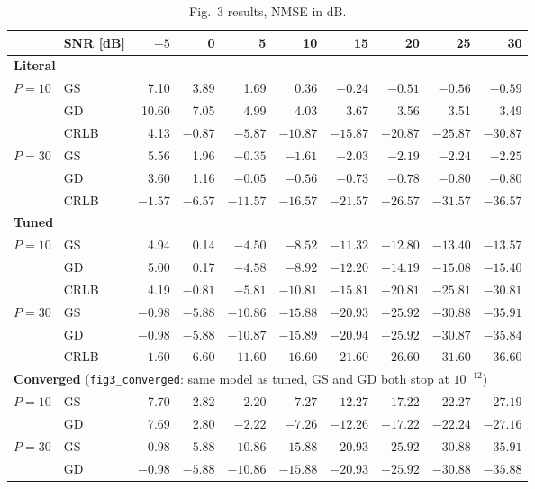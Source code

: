 \documentclass[11pt,a4paper]{article}
\newcommand{\file}[1]{\texttt{#1}}
\begin{document}
\begin{table}[h!]
\centering
\footnotesize
\caption{Fig.~3 results, NMSE in dB.}
\label{tab:fig3res}
\begin{tabular}{llrrrrrrrr}
\toprule
& SNR [dB] & $-5$ & 0 & 5 & 10 & 15 & 20 & 25 & 30 \\
\midrule
\multicolumn{10}{l}{\textbf{Literal}} \\
$P=10$ & GS   & 7.10 & 3.89 & 1.69 & 0.36 & $-0.24$ & $-0.51$ & $-0.56$ & $-0.59$ \\
       & GD   & 10.60 & 7.05 & 4.99 & 4.03 & 3.67 & 3.56 & 3.51 & 3.49 \\
       & CRLB & 4.13 & $-0.87$ & $-5.87$ & $-10.87$ & $-15.87$ & $-20.87$ & $-25.87$ & $-30.87$ \\
$P=30$ & GS   & 5.56 & 1.96 & $-0.35$ & $-1.61$ & $-2.03$ & $-2.19$ & $-2.24$ & $-2.25$ \\
       & GD   & 3.60 & 1.16 & $-0.05$ & $-0.56$ & $-0.73$ & $-0.78$ & $-0.80$ & $-0.80$ \\
       & CRLB & $-1.57$ & $-6.57$ & $-11.57$ & $-16.57$ & $-21.57$ & $-26.57$ & $-31.57$ & $-36.57$ \\
\midrule
\multicolumn{10}{l}{\textbf{Tuned}} \\
$P=10$ & GS   & 4.94 & 0.14 & $-4.50$ & $-8.52$ & $-11.32$ & $-12.80$ & $-13.40$ & $-13.57$ \\
       & GD   & 5.00 & 0.17 & $-4.58$ & $-8.92$ & $-12.20$ & $-14.19$ & $-15.08$ & $-15.40$ \\
       & CRLB & 4.19 & $-0.81$ & $-5.81$ & $-10.81$ & $-15.81$ & $-20.81$ & $-25.81$ & $-30.81$ \\
$P=30$ & GS   & $-0.98$ & $-5.88$ & $-10.86$ & $-15.88$ & $-20.93$ & $-25.92$ & $-30.88$ & $-35.91$ \\
       & GD   & $-0.98$ & $-5.88$ & $-10.87$ & $-15.89$ & $-20.94$ & $-25.92$ & $-30.87$ & $-35.84$ \\
       & CRLB & $-1.60$ & $-6.60$ & $-11.60$ & $-16.60$ & $-21.60$ & $-26.60$ & $-31.60$ & $-36.60$ \\
\midrule
\multicolumn{10}{l}{\textbf{Converged} (\file{fig3\_converged}: same model as tuned, GS and GD both stop at $10^{-12}$)} \\
$P=10$ & GS   & 7.70 & 2.82 & $-2.20$ & $-7.27$ & $-12.27$ & $-17.22$ & $-22.27$ & $-27.19$ \\
       & GD   & 7.69 & 2.80 & $-2.22$ & $-7.26$ & $-12.26$ & $-17.22$ & $-22.24$ & $-27.16$ \\
$P=30$ & GS   & $-0.98$ & $-5.88$ & $-10.86$ & $-15.88$ & $-20.93$ & $-25.92$ & $-30.88$ & $-35.91$ \\
       & GD   & $-0.98$ & $-5.88$ & $-10.86$ & $-15.88$ & $-20.93$ & $-25.92$ & $-30.88$ & $-35.88$ \\
\bottomrule
\end{tabular}
\end{table}
\end{document}
